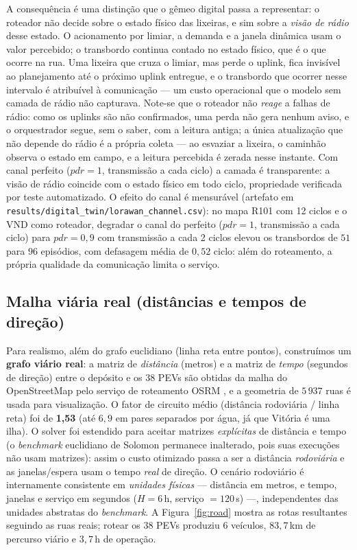 \documentclass[12pt, a4paper]{article}
\begin{document}
A consequência é uma distinção que o gêmeo digital passa a representar: o roteador não decide sobre o estado físico das lixeiras, e sim sobre a \emph{visão de rádio} desse estado. O acionamento por limiar, a demanda e a janela dinâmica usam o valor percebido; o transbordo continua contado no estado físico, que é o que ocorre na rua. Uma lixeira que cruza o limiar, mas perde o uplink, fica invisível ao planejamento até o próximo uplink entregue, e o transbordo que ocorrer nesse intervalo é atribuível à comunicação --- um custo operacional que o modelo sem camada de rádio não capturava. Note-se que o roteador não \emph{reage} a falhas de rádio: como os uplinks são não confirmados, uma perda não gera nenhum aviso, e o orquestrador segue, sem o saber, com a leitura antiga; a única atualização que não depende do rádio é a própria coleta --- ao esvaziar a lixeira, o caminhão observa o estado em campo, e a leitura percebida é zerada nesse instante. Com canal perfeito ($\mathit{pdr}=1$, transmissão a cada ciclo) a camada é transparente: a visão de rádio coincide com o estado físico em todo ciclo, propriedade verificada por teste automatizado. O efeito do canal é mensurável (artefato em \texttt{results/digital\_twin/lorawan\_channel.csv}): no mapa R101 com 12 ciclos e o VND como roteador, degradar o canal do perfeito ($\mathit{pdr}=1$, transmissão a cada ciclo) para $\mathit{pdr}=0{,}9$ com transmissão a cada 2 ciclos elevou os transbordos de $51$ para $96$ episódios, com defasagem média de $0{,}52$ ciclo: além do roteamento, a própria qualidade da comunicação limita o serviço.

\subsection{Malha viária real (distâncias e tempos de direção)}\label{sec:road}
Para realismo, além do grafo euclidiano (linha reta entre pontos), construímos um \textbf{grafo viário real}: a matriz de \emph{distância} (metros) e a matriz de \emph{tempo} (segundos de direção) entre o depósito e os 38 PEVs são obtidas da malha do OpenStreetMap pelo serviço de roteamento OSRM \citep{luxen2011osrm}, e a geometria de $5\,937$ ruas é usada para visualização. O fator de circuito médio (distância rodoviária / linha reta) foi de \textbf{1{,}53} (até $6{,}9$ em pares separados por água, já que Vitória é uma ilha). O solver foi estendido para aceitar matrizes \emph{explícitas} de distância e tempo (o \textit{benchmark} euclidiano de Solomon permanece inalterado, pois suas execuções não usam matrizes): assim o custo otimizado passa a ser a distância \emph{rodoviária} e as janelas/espera usam o tempo \emph{real} de direção. O cenário rodoviário é internamente consistente em \emph{unidades físicas} --- distância em metros, e tempo, janelas e serviço em segundos ($H=6$\,h, serviço $=120$\,s) ---, independentes das unidades abstratas do \textit{benchmark}. A Figura~\ref{fig:road} mostra as rotas resultantes seguindo as ruas reais; rotear os 38 PEVs produziu 6 veículos, $83{,}7$\,km de percurso viário e $3{,}7$\,h de operação.
\end{document}
